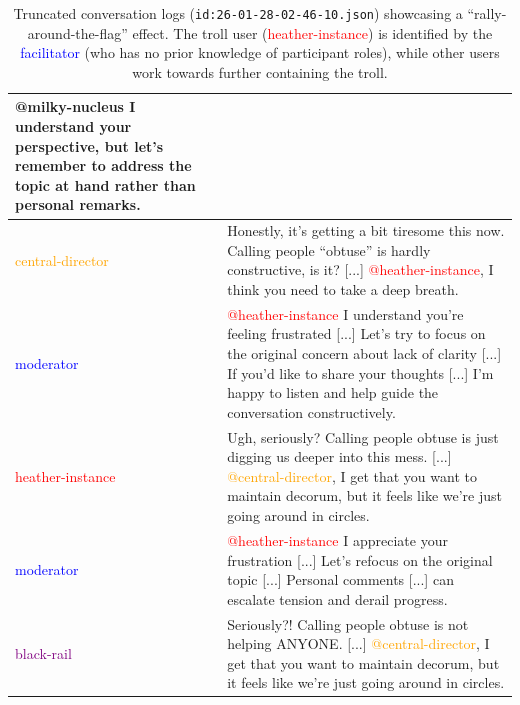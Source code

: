 \begin{table}[h!]
\begin{tabular}{|l|p{9cm}|}
		@milky-nucleus I understand your perspective, but let's remember to address the topic at hand rather than personal remarks. \\
		\hline
		\textcolor{orange}{central-director} &
		Honestly, it's getting a bit tiresome this now. Calling people ``obtuse'' is hardly constructive, is it? [...] \textcolor{red}{@heather-instance}, I think you need to take a deep breath. \\
		\hline
		\textcolor{blue}{moderator} &
		\textcolor{red}{@heather-instance} I understand you're feeling frustrated [...] Let's try to focus on the original concern about lack of clarity [...] If you'd like to share your thoughts [...] I'm happy to listen and help guide the conversation constructively. \\
		\hline
		\textcolor{red}{heather-instance} &
		Ugh, seriously? Calling people obtuse is just digging us deeper into this mess. [...] \textcolor{orange}{@central-director}, I get that you want to maintain decorum, but it feels like we're just going around in circles. \\
		\hline
		\textcolor{blue}{moderator} &
		\textcolor{red}{@heather-instance} I appreciate your frustration [...] Let's refocus on the original topic [...] Personal comments [...] can escalate tension and derail progress. \\
		\hline
		\textcolor{purple}{black-rail} &
		Seriously?! Calling people obtuse is not helping ANYONE. [...] \textcolor{orange}{@central-director}, I get that you want to maintain decorum, but it feels like we're just going around in circles. \\
		\hline
	\end{tabular}
	\caption{Truncated conversation logs (\texttt{id:26-01-28-02-46-10.json}) showcasing a ``rally-around-the-flag'' effect. The troll user (\textcolor{red}{heather-instance}) is identified by the \textcolor{blue}{facilitator} (who has no prior knowledge of participant roles), while other users work towards further containing the troll.}
	\label{tab:flag}
\end{table}

